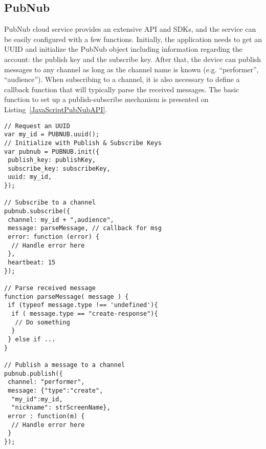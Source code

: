 \subsection*{PubNub}

PubNub cloud service provides an extensive API and SDKs, and the service can be easily configured with a few functions.
Initially, the application needs to get an UUID and initialize the PubNub object including information regarding the account: the publish key and the subscribe key.
After that, the device can publish messages to any channel as long as the channel name is known (e.g. ``performer'', ``audience'').
When subscribing to a channel, it is also necessary to define a callback function that will typically parse the received messages.
The basic function to set up a publish-subscribe mechanism is presented on Listing~\ref{JavaScriptPubNubAPI}.

\lstset{language=bash,  caption=Example of JavaScript code from PubNub API presented at audience page, captionpos=b, label=JavaScriptPubNubAPI, numbers=none, numberstyle=\scriptsize}

\begin{lstlisting}[frame=single, float=t]
// Request an UUID
var my_id = PUBNUB.uuid();
// Initialize with Publish & Subscribe Keys
var pubnub = PUBNUB.init({
 publish_key: publishKey,
 subscribe_key: subscribeKey,
 uuid: my_id,
});

// Subscribe to a channel
pubnub.subscribe({
 channel: my_id + ",audience",
 message: parseMessage, // callback for msg
 error: function (error) {
  // Handle error here
 },
 heartbeat: 15
});

// Parse received message
function parseMessage( message ) {
 if (typeof message.type !== 'undefined'){
  if ( message.type == "create-response"){
   // Do something
  }
 } else if ...
}

// Publish a message to a channel
pubnub.publish({
 channel: "performer",
 message: {"type":"create", 
  "my_id":my_id,
  "nickname": strScreenName},
 error : function(m) {
  // Handle error here
 }
});
\end{lstlisting}


